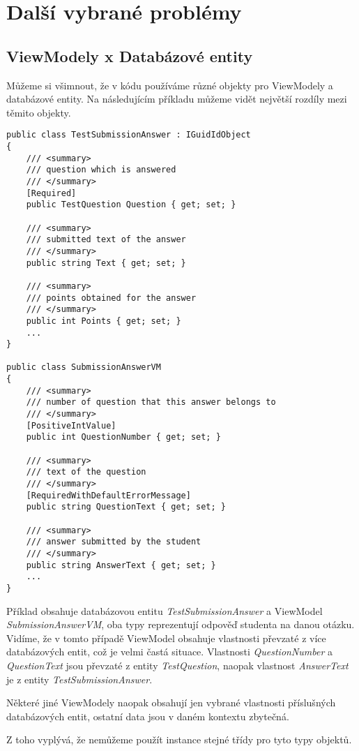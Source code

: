 \section{Další vybrané problémy}

\subsection{ViewModely x Databázové entity}

Můžeme si všimnout, že v kódu používáme různé objekty pro ViewModely a databázové entity. 
Na následujícím příkladu můžeme vidět největší rozdíly mezi těmito objekty.

\lstset{style=sharpc}
\begin{lstlisting}
public class TestSubmissionAnswer : IGuidIdObject
{	
	/// <summary>
	/// question which is answered
	/// </summary>
	[Required]
	public TestQuestion Question { get; set; }
	
	/// <summary>
	/// submitted text of the answer
	/// </summary>
	public string Text { get; set; }
	
	/// <summary>
	/// points obtained for the answer
	/// </summary>
	public int Points { get; set; }
	...
}

public class SubmissionAnswerVM
{	
	/// <summary>
	/// number of question that this answer belongs to
	/// </summary>
	[PositiveIntValue]
	public int QuestionNumber { get; set; }
	
	/// <summary>
	/// text of the question
	/// </summary>
	[RequiredWithDefaultErrorMessage]
	public string QuestionText { get; set; }
	
	/// <summary>
	/// answer submitted by the student
	/// </summary>
	public string AnswerText { get; set; }
	...
}
\end{lstlisting}

Příklad obsahuje databázovou entitu \textit{TestSubmissionAnswer} a ViewModel \textit{SubmissionAnswerVM}, oba typy reprezentují odpověď studenta na danou otázku.
Vidíme, že v tomto případě ViewModel obsahuje vlastnosti převzaté z více databázových entit, což je velmi častá situace. Vlastnosti \textit{QuestionNumber} a \textit{QuestionText} jsou převzaté z entity \textit{TestQuestion}, naopak vlastnost \textit{AnswerText} je z entity \textit{TestSubmissionAnswer}.

Některé jiné ViewModely naopak obsahují jen vybrané vlastnosti příslušných databázových entit, ostatní data jsou v daném kontextu zbytečná.

Z toho vyplývá, že nemůžeme použít instance stejné třídy pro tyto typy objektů.

